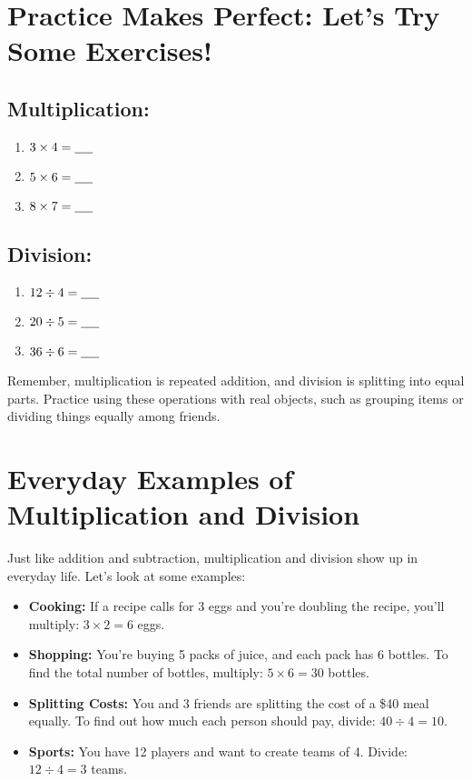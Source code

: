 \section{Practice Makes Perfect: Let’s Try Some Exercises!}
\begin{multicols}{2}
    \subsection{Multiplication:}
    \begin{enumerate}
        \item $3 \times 4 = \underline{\hspace{0.5cm}}$
        \item $5 \times 6 = \underline{\hspace{0.5cm}}$
        \item $8 \times 7 = \underline{\hspace{0.5cm}}$
    \end{enumerate}

    \subsection{Division:}
    \begin{enumerate}
        \item $12 \div 4 = \underline{\hspace{0.5cm}}$
        \item $20 \div 5 = \underline{\hspace{0.5cm}}$
        \item $36 \div 6 = \underline{\hspace{0.5cm}}$
    \end{enumerate}
\end{multicols}
Remember, multiplication is repeated addition, and division is splitting into equal parts. Practice using these operations with real objects, such as grouping items or dividing things equally among friends.

\section{Everyday Examples of Multiplication and Division}
Just like addition and subtraction, multiplication and division show up in everyday life. Let’s look at some examples:
\begin{itemize}
    \item \textbf{Cooking:} If a recipe calls for 3 eggs and you’re doubling the recipe, you’ll multiply: $3 \times 2 = 6$ eggs.
    \item \textbf{Shopping:} You’re buying 5 packs of juice, and each pack has 6 bottles. To find the total number of bottles, multiply: $5 \times 6 = 30$ bottles.
    \item \textbf{Splitting Costs:} You and 3 friends are splitting the cost of a \$40 meal equally. To find out how much each person should pay, divide: $40 \div 4 = 10$.
    \item \textbf{Sports:} You have 12 players and want to create teams of 4. Divide: $12 \div 4 = 3$ teams.
\end{itemize}

